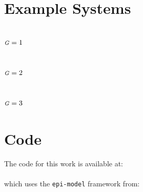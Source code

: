 \documentclass[10pt]{article}
\numberwithin{equation}{section}
\newcommand{\G}{{\mbox{\footnotesize{\textit{G}}}}}
\begin{document}
\section{Example Systems}\label{a:example-systems}
\subsection{$\G = 1$}

\subsection{$\G = 2$}

\subsection{$\G = 3$}

%
\clearpage
\section{Code}\label{a:code}
The code for this work is available at:\\
\projrepocommit\\
which uses the \texttt{epi-model} framework from:\\
\epimodelrepocommit\\
\end{document}
